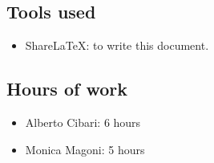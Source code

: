 \subsection*{Tools used}
    \begin{itemize}
    \item ShareLaTeX: to write this document.
    \end{itemize}
    
\subsection*{Hours of work}
    \begin{itemize}
    \item Alberto Cibari: 6 hours
    \item Monica Magoni: 5 hours
    \end{itemize}
